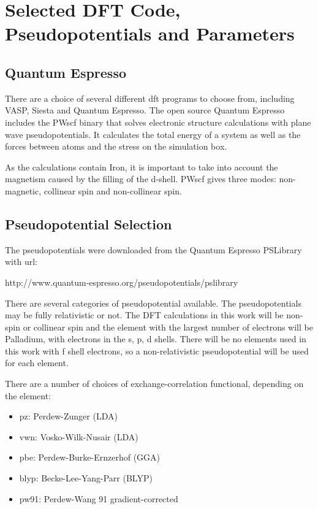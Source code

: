 \section[DFT Settings]{Selected DFT Code, Pseudopotentials and Parameters}


\subsection{Quantum Espresso}

There are a choice of several different \acrshort{dft} programs to choose from, including VASP, Siesta and Quantum Espresso.  The open source Quantum Espresso includes the PWscf binary that solves electronic structure calculations with plane wave pseudopotentials.  It calculates the total energy of a system as well as the forces between atoms and the stress on the simulation box.  

As the calculations contain Iron, it is important to take into account the magnetism caused by the filling of the d-shell.  PWscf gives three modes: non-magnetic, collinear spin and non-collinear spin.  



\subsection{Pseudopotential Selection}

The pseudopotentials were downloaded from the Quantum Espresso PSLibrary with url:

http://www.quantum-espresso.org/pseudopotentials/pslibrary 

There are several categories of pseudopotential available.  The pseudopotentials may be fully relativistic or not.  The DFT calculations in this work will be non-spin or collinear spin and the element with the largest number of electrons will be Palladium, with electrons in the s, p, d shells.  There will be no elements used in this work with f shell electrons, so a non-relativistic pseudopotential will be used for each element.

There are a number of choices of exchange-correlation functional, depending on the element:

\begin{itemize}
\item pz: Perdew-Zunger (LDA)
\item vwn: Vosko-Wilk-Nusair (LDA)
\item pbe: Perdew-Burke-Ernzerhof (GGA)
\item blyp: Becke-Lee-Yang-Parr (BLYP)
\item pw91: Perdew-Wang 91 gradient-corrected 
\end{itemize}

